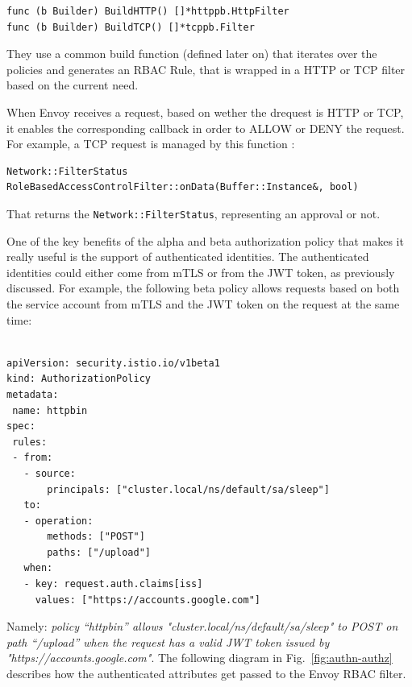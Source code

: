 \begin{lstlisting}[title=\href{https://github.com/istio/istio/blob/4e6e7f49375d84bb35ee614c6b7d38b6c2fd3e7b/pilot/pkg/security/authz/builder/builder.go\#L62-L92}{GitHub permalink}]
func (b Builder) BuildHTTP() []*httppb.HttpFilter
func (b Builder) BuildTCP() []*tcppb.Filter
\end{lstlisting}

\noindent They use a common build function (defined later on) that iterates over the policies and generates an RBAC Rule, that is wrapped in a HTTP or TCP filter based on the current need.

When Envoy receives a request, based on wether the drequest is HTTP or TCP, it enables the corresponding callback in order to ALLOW or DENY the request. For example, a TCP request is managed by this function \cite{envoycode}:

\begin{lstlisting}[title=\href{https://github.com/envoyproxy/envoy/blob/e9207f4f5e93fcec603cf4949763829010836ae2/source/extensions/filters/network/rbac/rbac_filter.cc\#L22-L63}{GitHub permalink}]
Network::FilterStatus RoleBasedAccessControlFilter::onData(Buffer::Instance&, bool)
\end{lstlisting}

That returns the \texttt{Network::FilterStatus}, representing an approval or not.

One of the key benefits of the alpha and beta authorization policy that makes it really useful is the support of authenticated identities. The authenticated identities could either come from mTLS or from the JWT token, as previously discussed.
For example, the following beta policy allows requests based on both the service account from mTLS and the JWT token on the request at the same time:

\begin{lstlisting}

apiVersion: security.istio.io/v1beta1
kind: AuthorizationPolicy
metadata:
 name: httpbin
spec:
 rules:
 - from:
   - source:
       principals: ["cluster.local/ns/default/sa/sleep"]
   to:
   - operation:
       methods: ["POST"]
       paths: ["/upload"]
   when:
   - key: request.auth.claims[iss]
     values: ["https://accounts.google.com"]

\end{lstlisting}

\noindent Namely: \textit{policy “httpbin” allows "cluster.local/ns/default/sa/sleep" to POST on path “/upload” when the request has a valid JWT token issued by "https://accounts.google.com"}. The following diagram in Fig.~\ref{fig:authn-authz} describes how the authenticated attributes get passed to the Envoy RBAC filter.

